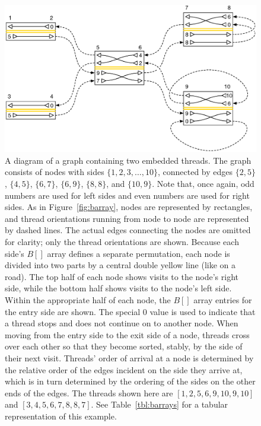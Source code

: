 \begin{figure}[h!]
\centering
\includegraphics[width=\linewidth]{figures/03_gpbwt/bstylemultinode.eps}
\caption[A diagram of a graph containing two embedded threads]{A diagram of a graph containing two embedded threads. The graph consists of nodes with sides $\{1, 2, 3, \ldots, 10\}$, connected by edges $\{2, 5\}$, $\{4, 5\}$, $\{6, 7\}$, $\{6, 9\}$, $\{8, 8\}$, and $\{10, 9\}$. Note that, once again, odd numbers are used for left sides and even numbers are used for right sides. As in Figure~\ref{fig:barray}, nodes are represented by rectangles, and thread orientations running from node to node are represented by dashed lines. The actual edges connecting the nodes are omitted for clarity; only the thread orientations are shown. Because each side's $B[]$ array defines a separate permutation, each node is divided into two parts by a central double yellow line (like on a road). The top half of each node shows visits to the node's right side, while the bottom half shows visits to the node's left side. Within the appropriate half of each node, the $B[]$ array entries for the entry side are shown. The special $0$ value is used to indicate that a thread stops and does not continue on to another node. When moving from the entry side to the exit side of a node, threads cross over each other so that they become sorted, stably, by the side of their next visit. Threads' order of arrival at a node is determined by the relative order of the edges incident on the side they arrive at, which is in turn determined by the ordering of the sides on the other ends of the edges. The threads shown here are $[1, 2, 5, 6, 9, 10, 9, 10]$ and $[3, 4, 5, 6, 7, 8, 8, 7]$. See Table~\ref{tbl:barrays} for a tabular representation of this example.}
\label{fig:bstylemultinode}
\end{figure}

